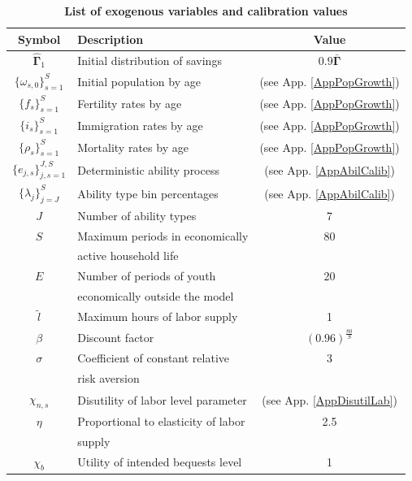 \documentclass[letterpaper,12pt]{article}
\theoremstyle{definition}
\begin{document}
\begin{spacing}{1.5}
    \begin{table}[htbp] \centering \captionsetup{width=4.4in}
    \caption{\label{TabExogVars}\textbf{List of exogenous variables and calibration values}}
      \begin{threeparttable}
      \begin{tabular}{>{\small}c |>{\small}l |>{\small}c}
        \hline\hline
        Symbol & \quad\quad\quad\quad Description & Value \\
        \hline
        $\bm{\hat{\Gamma}}_1$ & Initial distribution of savings & $0.9\bm{\bar{\Gamma}}$ \\
        $\{\omega_{s,0}\}_{s=1}^S$ & Initial population by age & (see App. \ref{AppPopGrowth}) \\
        $\{f_s\}_{s=1}^S$ & Fertility rates by age & (see App. \ref{AppPopGrowth}) \\
        $\{i_s\}_{s=1}^S$ & Immigration rates by age & (see App. \ref{AppPopGrowth}) \\
        $\{\rho_s\}_{s=1}^S$ & Mortality rates by age & (see App. \ref{AppPopGrowth}) \\
        $\{e_{j,s}\}_{j,s=1}^{J,S}$ & Deterministic ability process & (see App. \ref{AppAbilCalib}) \\
        $\{\lambda_j\}_{j=J}^S$ & Ability type bin percentages & (see App. \ref{AppAbilCalib}) \\
        $J$ & Number of ability types & 7 \\
        $S$ & Maximum periods in economically & 80 \\
        &\quad active household life & \\
        $E$ & Number of periods of youth & 20 \\
        & \quad economically outside the model & \\
        $\tilde{l}$ & Maximum hours of labor supply & 1 \\
        $\beta$ & Discount factor & $(0.96)^\frac{80}{S}$ \\
        $\sigma$ & Coefficient of constant relative & 3 \\
        & \quad risk aversion & \\
        $\chi_{n,s}$ & Disutility of labor level parameter & (see App. \ref{AppDisutilLab}) \\
        $\eta$ & Proportional to elasticity of labor & 2.5 \\
        & \quad supply & \\
        $\chi_b$ & Utility of intended bequests level & 1 \\

\end{tabular}
\end{threeparttable}
\end{table}
\end{spacing}
\end{document}
